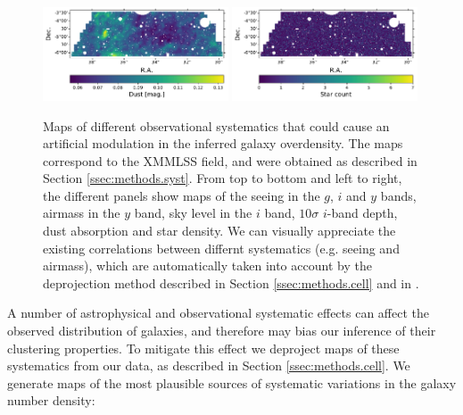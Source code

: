 \documentclass[a4paper,11pt]{article}
\begin{document}
\begin{figure}
      \includegraphics[width=0.49\textwidth]{figures/syst_dust.pdf}
      \includegraphics[width=0.49\textwidth]{figures/syst_star.pdf}
      \caption{Maps of different observational systematics that could cause an artificial modulation in the inferred galaxy overdensity. The maps correspond to the XMMLSS field, and were obtained as described in Section \ref{ssec:methods.syst}. From top to bottom and left to right, the different panels show maps of the seeing in the $g$, $i$ and $y$ bands, airmass in the $y$ band, sky level in the $i$ band, $10\sigma$ $i$-band depth, dust absorption and star density. We can visually appreciate the existing correlations between differnt systematics (e.g. seeing and airmass), which are automatically taken into account by the deprojection method described in Section \ref{ssec:methods.cell} and in \cite{2019MNRAS.484.4127A}.}
      \label{fig:sysmap}
    \end{figure}
    A number of astrophysical and observational systematic effects can affect the observed distribution of galaxies, and therefore may bias our inference of their clustering properties. To mitigate this effect we deproject maps of these systematics from our data, as described in Section \ref{ssec:methods.cell}. We generate maps of the most plausible sources of systematic variations in the galaxy number density:
\end{document}
